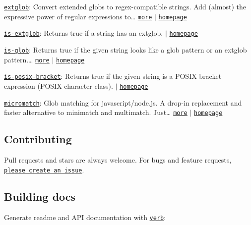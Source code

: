 \begin{DoxyItemize}
\item \href{https://www.npmjs.com/package/extglob}{\tt extglob}\+: Convert extended globs to regex-\/compatible strings. Add (almost) the expressive power of regular expressions to… \href{https://www.npmjs.com/package/extglob}{\tt more} $\vert$ \href{https://github.com/jonschlinkert/extglob}{\tt homepage}
\item \href{https://www.npmjs.com/package/is-extglob}{\tt is-\/extglob}\+: Returns true if a string has an extglob. $\vert$ \href{https://github.com/jonschlinkert/is-extglob}{\tt homepage}
\item \href{https://www.npmjs.com/package/is-glob}{\tt is-\/glob}\+: Returns {\ttfamily true} if the given string looks like a glob pattern or an extglob pattern.\+… \href{https://www.npmjs.com/package/is-glob}{\tt more} $\vert$ \href{https://github.com/jonschlinkert/is-glob}{\tt homepage}
\item \href{https://www.npmjs.com/package/is-posix-bracket}{\tt is-\/posix-\/bracket}\+: Returns true if the given string is a P\+O\+S\+IX bracket expression (P\+O\+S\+IX character class). $\vert$ \href{https://github.com/jonschlinkert/is-posix-bracket}{\tt homepage}
\item \href{https://www.npmjs.com/package/micromatch}{\tt micromatch}\+: Glob matching for javascript/node.\+js. A drop-\/in replacement and faster alternative to minimatch and multimatch. Just… \href{https://www.npmjs.com/package/micromatch}{\tt more} $\vert$ \href{https://github.com/jonschlinkert/micromatch}{\tt homepage}
\end{DoxyItemize}

\subsection*{Contributing}

Pull requests and stars are always welcome. For bugs and feature requests, \href{https://github.com/jonschlinkert/expand-brackets/issues/new}{\tt please create an issue}.

\subsection*{Building docs}

Generate readme and A\+PI documentation with \href{https://github.com/verbose/verb}{\tt verb}\+:




